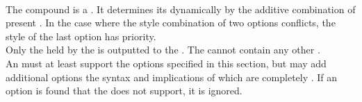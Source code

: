  \\

The compound  is a . It determines its  dynamically by the additive combination of present . In the case where the style combination of two options conflicts, the style of the last option has priority. \\

Only the  held by the  is outputted to the . The   cannot contain any other .\\

An  must at least support the options specified in this section, but may add additional options the syntax and implications of which are completely . If an option is found that the  does not support, it is ignored. \\











